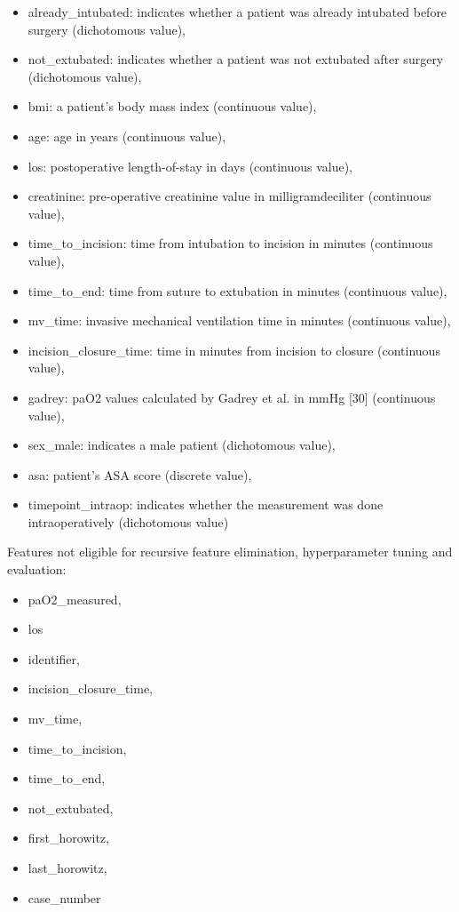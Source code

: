 \documentclass[referee,lineno,pdflatex,sn-nature]{sn-jnl}%
\theoremstyle{thmstyleone}%
\theoremstyle{thmstyletwo}%
\theoremstyle{thmstylethree}%
\begin{document}
\begin{appendices}
\begin{itemize}
    \item already\_intubated: indicates whether a patient was already intubated before surgery (dichotomous value),
    \item not\_extubated: indicates whether a patient was not extubated after surgery (dichotomous value),
    \item bmi: a patient’s body mass index (continuous value),
    \item age: age in years (continuous value), 
    \item los: postoperative length-of-stay in days (continuous value),
    \item creatinine: pre-operative creatinine value in milligram\/deciliter (continuous value), 
    \item time\_to\_incision: time from intubation to incision in minutes (continuous value),
    \item time\_to\_end: time from suture to extubation in minutes (continuous value),
    \item mv\_time: invasive mechanical ventilation time in minutes (continuous value),
    \item incision\_closure\_time: time in minutes from incision to closure (continuous value),
    \item gadrey: paO2 values calculated by Gadrey et al. in mmHg [30] (continuous value),
    \item sex\_male: indicates a male patient (dichotomous value),
    \item asa: patient’s ASA score (discrete value),
    \item timepoint\_intraop: indicates whether the measurement was done intraoperatively (dichotomous value)
\end{itemize}

Features not eligible for recursive feature elimination, hyperparameter tuning and evaluation:
\begin{itemize}
\item paO2\_measured,
\item los
\item identifier,
\item incision\_closure\_time,
\item mv\_time,
\item time\_to\_incision,
\item time\_to\_end,
\item not\_extubated,
\item first\_horowitz,
\item last\_horowitz,
\item case\_number
\end{itemize}


\end{appendices}
\end{document}
